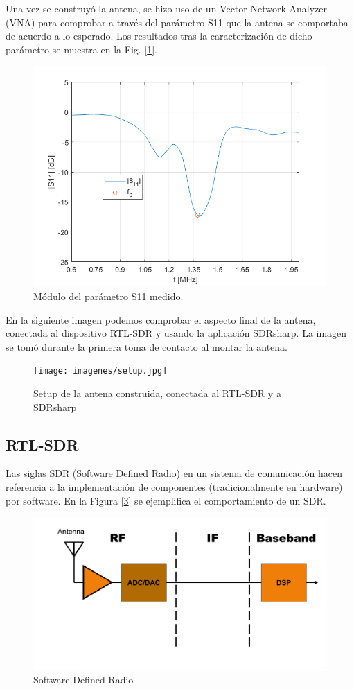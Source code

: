 \documentclass[a4paper,openright,12pt]{article}
\begin{document}
Una vez se construyó la antena, se hizo uso de un Vector Network Analyzer (VNA) para comprobar a través del parámetro S11 que la antena se comportaba de acuerdo a lo esperado. Los resultados tras la caracterización de dicho parámetro se muestra en la Fig. [\ref{fig:S11}].
\begin{figure}[H]
    \centering
    \includegraphics[width=0.55\linewidth]{imagenes/S11.png}
    \caption{Módulo del parámetro S11 medido.}
    \label{fig:S11}
\end{figure}

En la siguiente imagen podemos comprobar el aspecto final de la antena, conectada al dispositivo RTL-SDR y usando la aplicación SDRsharp. La imagen se tomó durante la primera toma de contacto al montar la antena.

\begin{figure}[H]
    \centering
    \texttt{[image: imagenes/setup.jpg]}
    \caption{Setup de la antena construida, conectada al RTL-SDR y a SDRsharp}
    \label{antena_real}
\end{figure}



	\subsection{RTL-SDR}
	Las siglas SDR (Software Defined Radio) en un sistema de comunicación hacen referencia a la implementación de componentes (tradicionalmente en hardware) por software. En la Figura [\ref{SDR}] se ejemplifica el comportamiento de un SDR.
	
 \begin{figure}[hbtp]
 \centering
 \includegraphics[width = 12cm]{imagenes/sdr.jpg}
 \caption{Software Defined Radio}
 \label{SDR}
 \end{figure}
\end{document}
